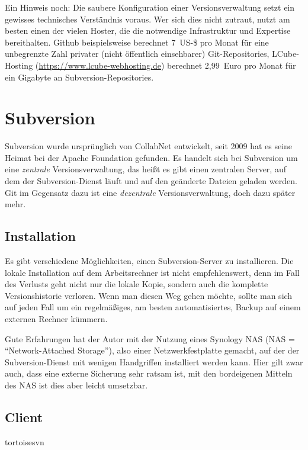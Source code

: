 Ein Hinweis noch: Die saubere Konfiguration einer Versionsverwaltung setzt ein gewisses technisches Verständnis voraus. Wer sich dies nicht zutraut, nutzt am besten einen der vielen Hoster, die die notwendige Infrastruktur und Expertise bereithalten. Github beispielsweise berechnet 7~US-\$ pro Monat für eine unbegrenzte Zahl privater (nicht öffentlich einsehbarer) Git-Repositories, LCube-Hosting (\url{https://www.lcube-webhosting.de}) berechnet 2,99~Euro pro Monat für ein Gigabyte an Subversion-Repositories.

\section{Subversion}

Subversion wurde ursprünglich von CollabNet entwickelt, seit 2009 hat es seine Heimat bei der Apache Foundation gefunden. Es handelt sich bei Subversion um eine \textit{zentrale} Versionsverwaltung, das heißt es gibt einen zentralen Server, auf dem der Subversion-Dienst läuft und auf den geänderte Dateien geladen werden. Git im Gegensatz dazu ist eine \textit{dezentrale} Versionsverwaltung, doch dazu später mehr.

\subsection{Installation}

Es gibt verschiedene Möglichkeiten, einen Subversion-Server zu installieren. Die lokale Installation auf dem Arbeitsrechner ist nicht empfehlenswert, denn im Fall des Verlusts geht nicht nur die lokale Kopie, sondern auch die komplette Versionshistorie verloren. Wenn man diesen Weg gehen möchte, sollte man sich auf jeden Fall um ein regelmäßiges, am besten automatisiertes, Backup auf einem externen Rechner kümmern. 

Gute Erfahrungen hat der Autor mit der Nutzung eines Synology NAS (NAS = \enquote{Network-Attached Storage}), also einer Netzwerkfestplatte gemacht, auf der der Subversion-Dienst mit wenigen Handgriffen installiert werden kann. Hier gilt zwar auch, dass eine externe Sicherung sehr ratsam ist, mit den bordeigenen Mitteln des NAS ist dies aber leicht umsetzbar.


\subsection{Client}

tortoisesvn


